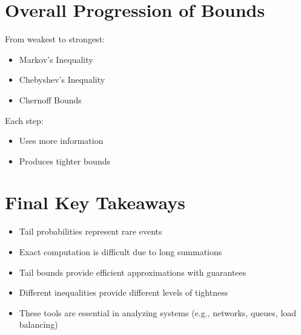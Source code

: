 \documentclass{article}
\begin{document}
\section{Overall Progression of Bounds}

From weakest to strongest:
\begin{itemize}
    \item Markov’s Inequality
    \item Chebyshev’s Inequality
    \item Chernoff Bounds
\end{itemize}

Each step:
\begin{itemize}
    \item Uses more information
    \item Produces tighter bounds
\end{itemize}

\section{Final Key Takeaways}

\begin{itemize}
    \item Tail probabilities represent rare events
    \item Exact computation is difficult due to long summations
    \item Tail bounds provide efficient approximations with guarantees
    \item Different inequalities provide different levels of tightness
    \item These tools are essential in analyzing systems (e.g., networks, queues, load balancing)
\end{itemize}
\end{document}
